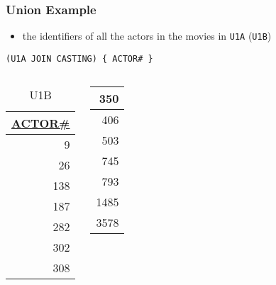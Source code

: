 \documentclass[dvipsnames]{beamer}
\theoremstyle{plain}
\begin{document}
\begin{frame}[fragile]
  \frametitle{Union Example}

  \begin{example}
    \begin{itemize}
      \item the identifiers of all the actors in the movies in \texttt{U1A}
        (\texttt{U1B})
    \end{itemize}

    \begin{lstlisting}
(U1A JOIN CASTING) { ACTOR# }
    \end{lstlisting}

    \pause
    \vspace{-10pt}
    \begin{columns}[b]
      \begin{tiny}
      \begin{table}
        \caption{U1B}
        \begin{tabular}{|r|}\hline
\underline{ACTOR\#}\\[2pt]\hline\hline
                  9\\\hline
                 26\\\hline
                138\\\hline
                187\\\hline
                282\\\hline
                302\\\hline
                308\\\hline
        \end{tabular}
      \end{table}
      \end{tiny}

      \begin{tiny}
      \begin{table}
        \begin{tabular}{|r|}\hline
                350\\\hline
                406\\\hline
                503\\\hline
                745\\\hline
                793\\\hline
               1485\\\hline
               3578\\\hline
        \end{tabular}
      \end{table}
      \end{tiny}
    \end{columns}
  \end{example}
\end{frame}
\end{document}
